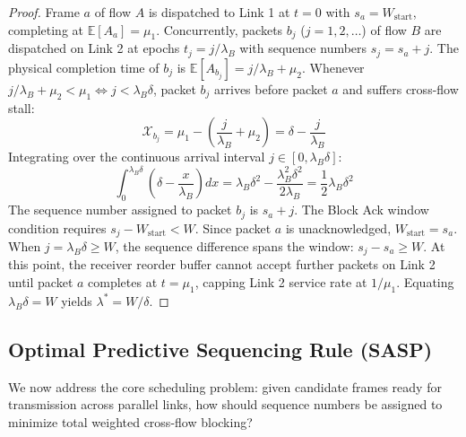 \documentclass[10pt,journal,compsoc]{IEEEtran}
\begin{document}
\begin{proof}
Frame $a$ of flow $A$ is dispatched to Link 1 at $t=0$ with $s_a = W_{\text{start}}$, completing at $\mathbb{E}[A_a] = \mu_1$. Concurrently, packets $b_j$ ($j = 1, 2, \dots$) of flow $B$ are dispatched on Link 2 at epochs $t_j = j / \lambda_B$ with sequence numbers $s_j = s_a + j$. The physical completion time of $b_j$ is $\mathbb{E}[A_{b_j}] = j / \lambda_B + \mu_2$. Whenever $j / \lambda_B + \mu_2 < \mu_1 \iff j < \lambda_B \delta$, packet $b_j$ arrives before packet $a$ and suffers cross-flow stall:
\begin{equation}
    \mathcal{X}_{b_j} = \mu_1 - \left(\frac{j}{\lambda_B} + \mu_2\right) = \delta - \frac{j}{\lambda_B}
\end{equation}
Integrating over the continuous arrival interval $j \in [0, \lambda_B \delta]$:
\begin{equation}
    \int_0^{\lambda_B \delta} \left(\delta - \frac{x}{\lambda_B}\right) dx = \lambda_B \delta^2 - \frac{\lambda_B^2 \delta^2}{2\lambda_B} = \frac{1}{2} \lambda_B \delta^2
\end{equation}
The sequence number assigned to packet $b_j$ is $s_a + j$. The Block Ack window condition requires $s_j - W_{\text{start}} < W$. Since packet $a$ is unacknowledged, $W_{\text{start}} = s_a$. When $j = \lambda_B \delta \ge W$, the sequence difference spans the window: $s_j - s_a \ge W$. At this point, the receiver reorder buffer cannot accept further packets on Link 2 until packet $a$ completes at $t = \mu_1$, capping Link 2 service rate at $1 / \mu_1$. Equating $\lambda_B \delta = W$ yields $\lambda^* = W / \delta$.
\end{proof}

\subsection{Optimal Predictive Sequencing Rule (SASP)}

We now address the core scheduling problem: given candidate frames ready for transmission across parallel links, how should sequence numbers be assigned to minimize total weighted cross-flow blocking?
\end{document}
